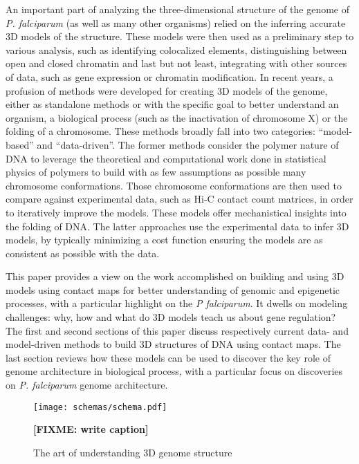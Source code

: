 \documentclass[letterpaper,12pt]{article}
\newcommand{\fixme}[1]{\textbf{[FIXME: #1]}}
\begin{document}
An important part of analyzing the three-dimensional structure of the genome
of {\em P. falciparum} (as well as many other organisms) relied on the
inferring accurate 3D models of the structure. These models were then used as
a preliminary step to various analysis, such as identifying colocalized
elements, distinguishing between open and closed chromatin and last but not
least, integrating with other sources of data, such as gene expression or
chromatin modification. In recent years, a profusion of methods were developed
for creating 3D models of the genome, either as standalone methods or with the
specific goal to better understand an organism, a biological process (such as
the inactivation of chromosome X) or the folding of a chromosome. These
methods broadly fall into two categories: ``model-based'' and ``data-driven''.
The former methods consider the polymer nature of DNA to leverage the
theoretical and computational work done in statistical physics of polymers to
build with as few assumptions as possible many chromosome conformations. Those
chromosome conformations are then used to compare against experimental data,
such as Hi-C contact count matrices, in order to iteratively improve the
models. These models offer mechanistical insights into the folding of DNA. The
latter approaches use the experimental data to infer 3D models, by typically
minimizing a cost function ensuring the models are as consistent as possible
with the data.

This paper provides a view on the work accomplished on building and using 3D
models using contact maps for better understanding of genomic and epigenetic
processes, with a particular highlight on the {\em P falciparum}. It dwells on
modeling challenges: why, how and what do 3D models teach us about gene
regulation? The first and second sections of this paper discuss respectively
current data- and model-driven methods to build 3D structures of DNA
using contact maps.  The last section reviews how these models can be used to
discover the key role of genome architecture in biological process, with a
particular focus on discoveries on {\em P. falciparum} genome architecture.


\begin{figure}
\centering
\texttt{[image: schemas/schema.pdf]}
\caption{The art of understanding 3D genome structure}{
\fixme{write caption}}
\label{Fig1}
\end{figure}
\end{document}
